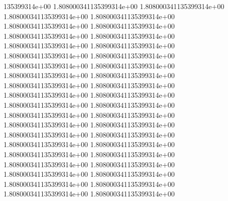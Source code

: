 135399314e+00	1.808000341135399314e+00	1.808000341135399314e+00	1.808000341135399314e+00	1.808000341135399314e+00	1.808000341135399314e+00	1.808000341135399314e+00	1.808000341135399314e+00	1.808000341135399314e+00	1.808000341135399314e+00	1.808000341135399314e+00	1.808000341135399314e+00	1.808000341135399314e+00	1.808000341135399314e+00	1.808000341135399314e+00	1.808000341135399314e+00	1.808000341135399314e+00	1.808000341135399314e+00	1.808000341135399314e+00	1.808000341135399314e+00	1.808000341135399314e+00	1.808000341135399314e+00	1.808000341135399314e+00	1.808000341135399314e+00	1.808000341135399314e+00	1.808000341135399314e+00	1.808000341135399314e+00	1.808000341135399314e+00	1.808000341135399314e+00	1.808000341135399314e+00	1.808000341135399314e+00	1.808000341135399314e+00	1.808000341135399314e+00	1.808000341135399314e+00	1.808000341135399314e+00	1.808000341135399314e+00	1.808000341135399314e+00	1.808000341135399314e+00	1.808000341135399314e+00	1.808000341135399314e+00	1.808000341135399314e+00
